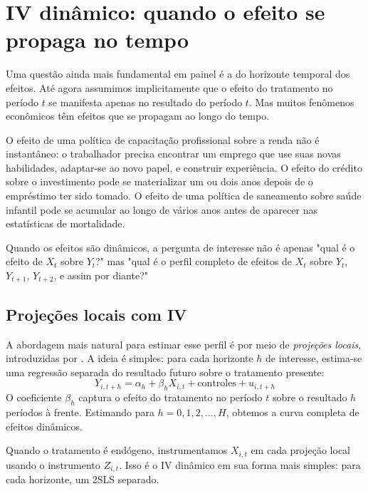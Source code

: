 \section{IV dinâmico: quando o efeito se propaga no tempo}
\label{sec:iv_dinamico}

Uma questão ainda mais fundamental em painel é a do horizonte temporal dos efeitos. Até agora assumimos implicitamente que o efeito do tratamento no período $t$ se manifesta apenas no resultado do período $t$. Mas muitos fenômenos econômicos têm efeitos que se propagam ao longo do tempo.

O efeito de uma política de capacitação profissional sobre a renda não é instantâneo: o trabalhador precisa encontrar um emprego que use suas novas habilidades, adaptar-se ao novo papel, e construir experiência. O efeito do crédito sobre o investimento pode se materializar um ou dois anos depois de o empréstimo ter sido tomado. O efeito de uma política de saneamento sobre saúde infantil pode se acumular ao longo de vários anos antes de aparecer nas estatísticas de mortalidade.

Quando os efeitos são dinâmicos, a pergunta de interesse não é apenas "qual é o efeito de $X_t$ sobre $Y_t$?" mas "qual é o perfil completo de efeitos de $X_t$ sobre $Y_t$, $Y_{t+1}$, $Y_{t+2}$, e assim por diante?"

\subsection*{Projeções locais com IV}

A abordagem mais natural para estimar esse perfil é por meio de \textit{projeções locais}, introduzidas por \citet{Jorda2005}. A ideia é simples: para cada horizonte $h$ de interesse, estima-se uma regressão separada do resultado futuro sobre o tratamento presente:
\begin{equation}
Y_{i,t+h} = \alpha_h + \beta_h X_{i,t} + \text{controles} + u_{i,t+h}
\label{eq:lp}
\end{equation}
O coeficiente $\beta_h$ captura o efeito do tratamento no período $t$ sobre o resultado $h$ períodos à frente. Estimando para $h = 0, 1, 2, \ldots, H$, obtemos a curva completa de efeitos dinâmicos.

Quando o tratamento é endógeno, instrumentamos $X_{i,t}$ em cada projeção local usando o instrumento $Z_{i,t}$. Isso é o IV dinâmico em sua forma mais simples: para cada horizonte, um 2SLS separado.

